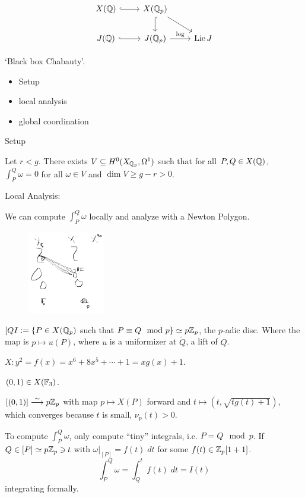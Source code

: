 	
	\[
	\begin{tikzcd}
	X(\Q) \arrow[hook]{r} & X(\Q_p) \arrow[hook]{d} \arrow{dr} \\
	J(\Q) \arrow[hook]{r} & J(\Q_p) \arrow{r}{\log} &  \lie J
	\end{tikzcd}
	\]


`Black box Chabauty'.

\begin{itemize}
\item Setup
\item local analysis
\item global coordination 
\end{itemize}


Setup

Let $r<g$. There exists $V \subseteq H^0(X_{\mathbb{Q}_p}, \Omega^1)$ such that for all $P,Q \in X(\mathbb{Q})$, $\int_P^Q \omega= 0$ for all $\omega \in V$ and $\dim V \geq g-r > 0$.


Local Analysis:

We can compute $\int_P^Q \omega$ locally and analyze with a Newton Polygon.

	\begin{figure}[!ht]
	\centering
	\includegraphics[width=0.3\textwidth]{../images/im3.png}
	\end{figure}

$[QI:= \{P \in X(\mathbb{Q}_p)$ such that $P \equiv Q \mod p \} \simeq p\mathbb{Z}_p$, the $p$-adic disc. Where the map is $p \mapsto u(P)$, where $u$ is a uniformizer at $\tilde{Q}$, a lift of $Q$.


\begin{ex}[HP survey]
$X: y^2= f(x)= x^6+8x^5+\cdots+1= xg(x)+1$.

$(0,1) \in X(\mathbb{F}_3)$.

$[(0,1)] \stackrel{\sim}{\longrightarrow} p\mathbb{Z}_p$ with map $p \mapsto X(P)$ forward and $t \mapsto (t,\sqrt{tg(t)+1})$, which converges because $t$ is small, $\nu_p(t) > 0$. 
\end{ex}


To compute $\int_P^Q \omega$, only compute ``tiny'' integrals, i.e. $P=Q \mod p$. If $Q \in [P] \simeq p \mathbb{Z}_p \ni t$ with $\omega |_{[P]} = f(t) \;dt$ for some $f(t) \in \mathbb{Z}_p[1+1]$.
	\[
	\int_P^Q \omega= \int_Q^t f(t) \;dt = I(t)
	\]
integrating formally. 

























